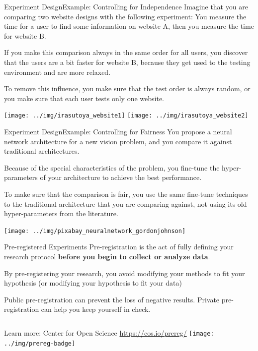 \begin{frame}{Experiment Design}{Example: Controlling for Independence}
  Imagine that you are comparing two website designs with the following experiment: You measure the time for a user to find some information on website A, then you measure the time for website B. \bigskip

  If you make this comparison always in the same order for all users, you discover that the users are a bit faster for website B, because they get used to the testing environment and are more relaxed. \bigskip

  To remove this influence, you make sure that the test order is always random, or you make sure that each user tests only one website.

  \begin{center}
    \texttt{[image: ../img/irasutoya\_website1]}\hspace{1cm}
    \texttt{[image: ../img/irasutoya\_website2]}
  \end{center}
\end{frame}

\begin{frame}{Experiment Design}{Example: Controlling for Fairness}
  You propose a neural network architecture for a new vision problem, and you compare it against traditional architectures.\bigskip

  Because of the special characteristics of the problem, you fine-tune the hyper-parameters of your architecture to achieve the best performance.\bigskip

  To make sure that the comparison is fair, you use the same fine-tune techniques to the traditional architecture that you are comparing against, not using its old hyper-parameters from the literature.

  \hfill\texttt{[image: ../img/pixabay\_neuralnetwork\_gordonjohnson]}
\end{frame}

\begin{frame}{Pre-registered Experiments}
  Pre-registration is the act of fully defining your research protocol {\bf before you begin to collect or analyze data}.
  \bigskip

  By pre-registering your research, you avoid modifying your methods to fit your hypothesis (or modifying your hypothesis to fit your data)
  \bigskip

  Public pre-registration can prevent the loss of negative results. Private pre-registration can help you keep yourself in check.\bigskip

  \begin{columns}
    Learn more: Center for Open Science \url{https://cos.io/prereg/}
    \texttt{[image: ../img/prereg-badge]}
  \end{columns}
\end{frame}

